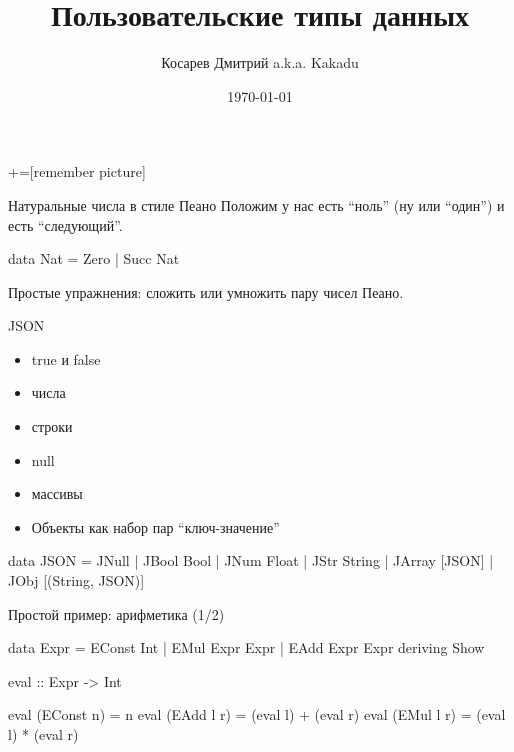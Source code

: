 \documentclass[
  xcolor={svgnames},
  hyperref={colorlinks,citecolor=DeepPink4,linkcolor=DarkRed,urlcolor=DarkBlue}]{beamer}
\title[Занятие 2]{Пользовательские типы данных}
\author{Косарев Дмитрий a.k.a. Kakadu}
\institute{матмех СПбГУ}
\date{\today}
\begin{document}
\maketitle

+=[remember picture]

\everymath{\displaystyle}


\begin{frame}[fragile]{Натуральные числа в стиле Пеано}
Положим у нас есть ``ноль'' (ну или ``один'') и есть ``следующий''.
\pause
\begin{hslisting}
data Nat = Zero | Succ Nat
\end{hslisting}
\pause
Простые упражнения: сложить или умножить пару чисел Пеано.
\end{frame}

\begin{frame}[fragile]{JSON}
\begin{itemize}
 \item true и false
 \item числа
 \item строки
 \item null
 \item массивы
 \item Объекты как набор пар ``ключ-значение''
\end{itemize}
\pause
\begin{verbnobox}[\monacoB]
data JSON = 
            JNull
          | JBool Bool
          | JNum   Float
          | JStr   String
          | JArray [JSON]
          | JObj   [(String, JSON)]
\end{verbnobox}
\end{frame}

\begin{frame}[fragile]{Простой пример: арифметика (1/2)}
\begin{verbnobox}[\monacoB]
data Expr =
    EConst Int
  | EMul Expr Expr
  | EAdd Expr Expr
  deriving Show
\end{verbnobox}
\begin{verbnobox}[\monacoB]
eval :: Expr -> Int
\end{verbnobox}
\pause
\begin{verbnobox}[\monacoB]
eval (EConst n) = n
eval (EAdd l r) = (eval l) + (eval r)
eval (EMul l r) = (eval l) * (eval r)
\end{verbnobox}
\end{frame}
\end{document}
